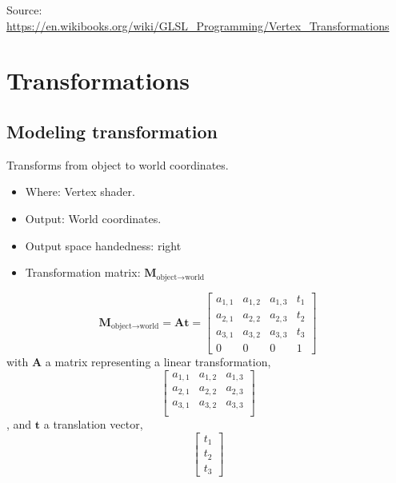 \documentclass{scrartcl}
\begin{document}
    Source: \url{https://en.wikibooks.org/wiki/GLSL_Programming/Vertex_Transformations} 
    
    \section{Transformations}
    
    \subsection{Modeling transformation} 
    
        Transforms from object to world coordinates.
        \begin{itemize}
            \item Where: Vertex shader.
            \item Output: World coordinates.
            \item Output space handedness: right
            \item Transformation  matrix: \(\mathbf{M}_{\text{object}\to\text{world}}\)
        \end{itemize}          
      
        
        \[
        \mathbf{M}_{\text{object}\to \text{world}} = \mathbf{A}\mathbf{t} =
        \begin{bmatrix}
            a_{1,1} & a_{1,2} & a_{1,3} & t_1 \\
            a_{2,1} & a_{2,2} & a_{2,3} & t_2 \\
            a_{3,1} & a_{3,2} & a_{3,3} & t_3 \\
            0 & 0 & 0 & 1 
        \end{bmatrix}
        \]
        with $\mathbf{A}$ a matrix representing a linear transformation,
        \[
        \begin{bmatrix}
            a_{1,1} & a_{1,2} & a_{1,3} \\
            a_{2,1} & a_{2,2} & a_{2,3} \\
            a_{3,1} & a_{3,2} & a_{3,3} \\
        \end{bmatrix} 
        \],
        and $\mathbf{t}$ a translation vector,
        \[
        \begin{bmatrix}
            t_1\\
            t_2\\
            t_3 
        \end{bmatrix}
        \]
        
\end{document}
